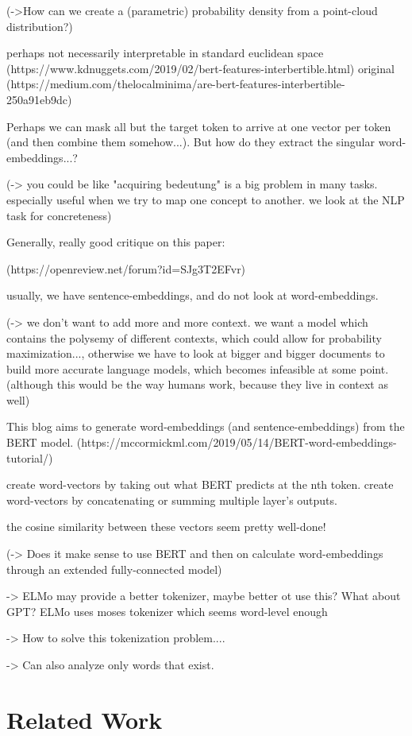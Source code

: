\documentclass[a4paper,12pt,twoside,openright]{report}
\begin{document}
(->How can we create a (parametric) probability density from a point-cloud distribution?)

perhaps not necessarily interpretable in standard euclidean space
(https://www.kdnuggets.com/2019/02/bert-features-interbertible.html)
original (https://medium.com/thelocalminima/are-bert-features-interbertible-250a91eb9dc)

Perhaps we can mask all but the target token to arrive at one vector per token (and then combine them somehow...).
But how do they extract the singular word-embeddings...?

(-> you could be like "acquiring bedeutung" is a big problem in many tasks. especially useful when we try to map one concept to another. we look at the NLP task for concreteness)

Generally, really good critique on this paper:

(https://openreview.net/forum?id=SJg3T2EFvr)

usually, we have sentence-embeddings, and do not look at word-embeddings.

(-> we don't want to add more and more context. we want a model which contains the polysemy of different contexts, which could allow for probability maximization..., otherwise we have to look at bigger and bigger documents to build more accurate language models, which becomes infeasible at some point. (although this would be the way humans work, because they live in context as well)

This blog aims to generate word-embeddings (and sentence-embeddings) from the BERT model.
(https://mccormickml.com/2019/05/14/BERT-word-embeddings-tutorial/)

create word-vectors by taking out what BERT predicts at the nth token.
create word-vectors by concatenating or summing multiple layer's outputs.

the cosine similarity between these vectors seem pretty well-done!


(-> Does it make sense to use BERT and then on calculate word-embeddings through an extended fully-connected model)

-> ELMo may provide a better tokenizer, maybe better ot use this? What about GPT? ELMo uses moses tokenizer which seems word-level enough

-> How to solve this tokenization problem....

-> Can also analyze only words that exist.




\chapter{Related Work}
\end{document}
